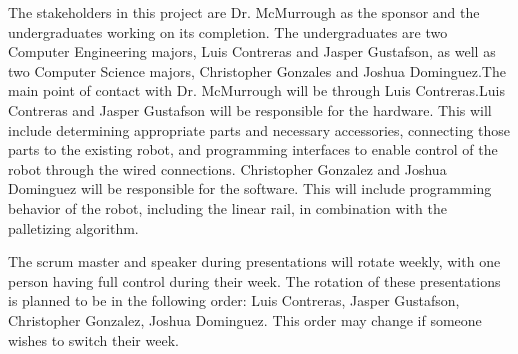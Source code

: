 The stakeholders in this project are Dr. McMurrough as the sponsor and the undergraduates working on its completion. The undergraduates are two Computer Engineering majors, Luis Contreras and Jasper Gustafson, as well as two Computer Science majors, Christopher Gonzales and Joshua Dominguez.The main point of contact with Dr. McMurrough will be through Luis Contreras.Luis Contreras and Jasper Gustafson will be responsible for the hardware. This will include determining appropriate parts and necessary accessories, connecting those parts to the existing robot, and programming interfaces to enable control of the robot through the wired connections. Christopher Gonzalez and Joshua Dominguez will be responsible for the software. This will include programming behavior of the robot, including the linear rail, in combination with the palletizing algorithm.

The scrum master and speaker during presentations will rotate weekly, with one person having full control during their week. The rotation of these presentations is planned to be in the following order: Luis Contreras, Jasper Gustafson, Christopher Gonzalez, Joshua Dominguez. This order may change if someone wishes to switch their week.